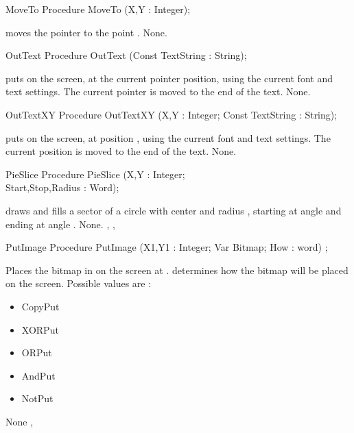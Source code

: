 \begin{procedure}{MoveTo}
\Declaration
Procedure MoveTo (X,Y : Integer);

\Description
{} moves the pointer to the
point .
\Errors
None.
\SeeAlso
{}
\end{procedure}
\begin{procedure}{OutText}
\Declaration
Procedure OutText (Const TextString : String);

\Description
{} puts  on the screen, at the current pointer
position, using the current font and text settings. The current pointer is
moved to the end of the text.
\Errors
None.
\SeeAlso
{}
\end{procedure}
\begin{procedure}{OutTextXY}
\Declaration
Procedure OutTextXY (X,Y : Integer; Const TextString : String);

\Description
{} puts  on the screen, at position ,
using the current font and text settings. The current position is
moved to the end of the text.
\Errors
None.
\SeeAlso
{}
\end{procedure}
\begin{procedure}{PieSlice}
\Declaration
Procedure PieSlice (X,Y : Integer; \\ Start,Stop,Radius : Word);

\Description
{}
draws and fills a sector of a circle with center  and radius 
, starting at angle  and ending at angle .
\Errors
None.
\SeeAlso
{}, , 
\end{procedure}
\begin{procedure}{PutImage}
\Declaration
Procedure PutImage (X1,Y1 : Integer; Var Bitmap; How : word) ;

\Description
{}
Places the bitmap in  on the screen at . 
determines how the bitmap will be placed on the screen. Possible values are :
\begin{itemize}
\item CopyPut
\item XORPut
\item ORPut
\item AndPut
\item NotPut
\end{itemize}
\Errors
None
\SeeAlso
{},
\end{procedure}
